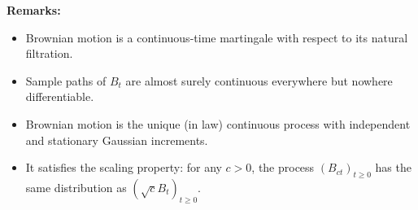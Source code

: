 \vspace{1em}
\textbf{Remarks:}
\begin{itemize}
  \item Brownian motion is a continuous-time martingale with respect to its natural filtration.
  \item Sample paths of \( B_t \) are almost surely continuous everywhere but nowhere differentiable.
  \item Brownian motion is the unique (in law) continuous process with independent and stationary Gaussian increments.
  \item It satisfies the scaling property: for any \( c > 0 \), the process \( (B_{ct})_{t \geq 0} \) has the same distribution as \( (\sqrt{c} B_t)_{t \geq 0} \).
\end{itemize}